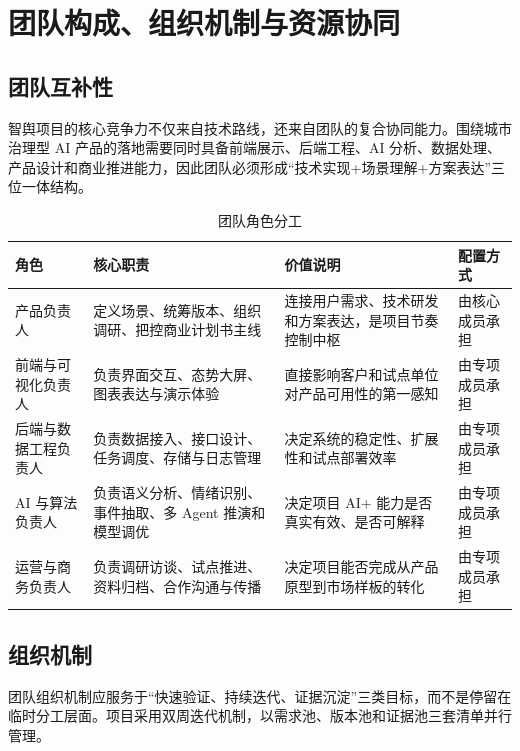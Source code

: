 \chapter{团队构成、组织机制与资源协同}

\section{团队互补性}

智舆项目的核心竞争力不仅来自技术路线，还来自团队的复合协同能力。围绕城市治理型 AI 产品的落地需要同时具备前端展示、后端工程、AI 分析、数据处理、产品设计和商业推进能力，因此团队必须形成“技术实现+场景理解+方案表达”三位一体结构。

\begin{table}[htbp]
	\centering
	\caption{团队角色分工}
	\begin{tabularx}{\textwidth}{L{2.6cm}L{3.2cm}Y L{2.8cm}}
		\toprule
		角色         & 核心职责                             & 价值说明                       & 配置方式    \\
		\midrule
		产品负责人      & 定义场景、统筹版本、组织调研、把控商业计划书主线         & 连接用户需求、技术研发和方案表达，是项目节奏控制中枢 & 由核心成员承担 \\
		前端与可视化负责人  & 负责界面交互、态势大屏、图表表达与演示体验            & 直接影响客户和试点单位对产品可用性的第一感知     & 由专项成员承担 \\
		后端与数据工程负责人 & 负责数据接入、接口设计、任务调度、存储与日志管理         & 决定系统的稳定性、扩展性和试点部署效率        & 由专项成员承担 \\
		AI 与算法负责人  & 负责语义分析、情绪识别、事件抽取、多 Agent 推演和模型调优 & 决定项目 AI+ 能力是否真实有效、是否可解释    & 由专项成员承担 \\
		运营与商务负责人   & 负责调研访谈、试点推进、资料归档、合作沟通与传播         & 决定项目能否完成从产品原型到市场样板的转化      & 由专项成员承担 \\
		\bottomrule
	\end{tabularx}
\end{table}



\section{组织机制}

团队组织机制应服务于“快速验证、持续迭代、证据沉淀”三类目标，而不是停留在临时分工层面。项目采用双周迭代机制，以需求池、版本池和证据池三套清单并行管理。


